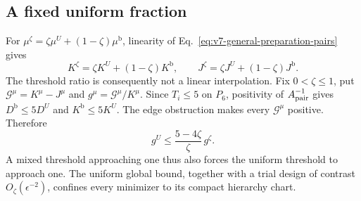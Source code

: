 \documentclass[aps,pre,reprint,amsmath,amssymb,longbibliography]{revtex4-2}
\begin{document}
\subsection{A fixed uniform fraction}
\label{app:v7-fixed-mixture}
For $\mu^\zeta=\zeta\mu^U+(1-\zeta)\mu^{\mathrm b}$,
linearity of Eq.~\eqref{eq:v7-general-preparation-pairs} gives
\begin{equation}
 K^\zeta=\zeta K^U+(1-\zeta)K^{\mathrm b},\qquad
 J^\zeta=\zeta J^U+(1-\zeta)J^{\mathrm b}.
 \label{eq:v7-mixture-exact}
\end{equation}
The threshold ratio is consequently not a linear interpolation.
Fix $0<\zeta\le1$, put $\mathcal G^\mu=K^\mu-J^\mu$ and
$g^\mu=\mathcal G^\mu/K^\mu$. Since $T_i\le5$ on $P_6$,
positivity of $A_{\rm pair}^{-1}$ gives
$D^{\mathrm b}\le5D^U$ and $K^{\mathrm b}\le5K^U$.
The edge obstruction makes every $\mathcal G^\mu$ positive. Therefore
\begin{equation}
 g^U\le\frac{5-4\zeta}{\zeta}\,g^\zeta.
 \label{eq:v7-mixture-localization}
\end{equation}
A mixed threshold approaching one thus also forces the uniform
threshold to approach one. The uniform global bound, together with
a trial design of contrast $O_\zeta(\epsilon^{-2})$, confines every
minimizer to its compact hierarchy chart.
\end{document}
